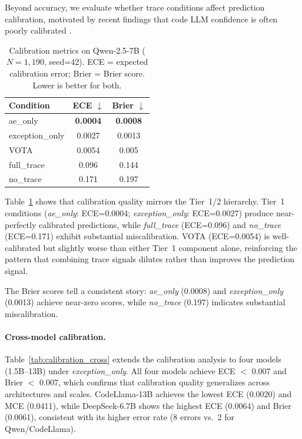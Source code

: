 Beyond accuracy, we evaluate whether trace conditions affect prediction calibration, motivated by recent findings that code LLM confidence is often poorly calibrated \citep{spiess2025calibration}.

\begin{table}[h!]
\centering
\caption{Calibration metrics on Qwen-2.5-7B ($N{=}1{,}190$, seed=42). ECE = expected calibration error; Brier = Brier score. Lower is better for both.}
\label{tab:calibration}
\small
\begin{tabular}{lcc}
\toprule
\textbf{Condition} & \textbf{ECE $\downarrow$} & \textbf{Brier $\downarrow$} \\
\midrule
ae\_only & \textbf{0.0004} & \textbf{0.0008} \\
exception\_only & 0.0027 & 0.0013 \\
VOTA & 0.0054 & 0.005 \\
full\_trace & 0.096 & 0.144 \\
no\_trace & 0.171 & 0.197 \\
\bottomrule
\end{tabular}
\end{table}

Table~\ref{tab:calibration} shows that calibration quality mirrors the Tier~1/2 hierarchy.
Tier~1 conditions (\textit{ae\_only}: ECE=0.0004; \textit{exception\_only}: ECE=0.0027) produce near-perfectly calibrated predictions, while \textit{full\_trace} (ECE=0.096) and \textit{no\_trace} (ECE=0.171) exhibit substantial miscalibration.
VOTA (ECE=0.0054) is well-calibrated but slightly worse than either Tier~1 component alone, reinforcing the pattern that combining trace signals dilutes rather than improves the prediction signal.

The Brier scores tell a consistent story: \textit{ae\_only} (0.0008) and \textit{exception\_only} (0.0013) achieve near-zero scores, while \textit{no\_trace} (0.197) indicates substantial miscalibration.

\paragraph{Cross-model calibration.}
Table~\ref{tab:calibration_cross} extends the calibration analysis to four models (1.5B--13B) under \textit{exception\_only}.
All four models achieve ECE ${<}$ 0.007 and Brier ${<}$ 0.007, which confirms that calibration quality generalizes across architectures and scales.
CodeLlama-13B achieves the lowest ECE (0.0020) and MCE (0.0411), while DeepSeek-6.7B shows the highest ECE (0.0064) and Brier (0.0061), consistent with its higher error rate (8 errors vs.\ 2 for Qwen/CodeLlama).

